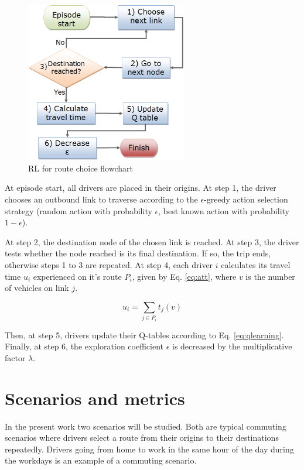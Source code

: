 \documentclass{RITA}
\newcommand{\route}[1]{\ensuremath{P_#1}}	%
\newcommand{\travTime}{\ensuremath{t_j}} 	%
\newcommand{\veh}{\ensuremath{v}}		%
\newcommand{\att}[1]{\ensuremath{u_#1}}		%
\begin{document}
\begin{figure}[ht]
    \centerline{\includegraphics[width=7cm]{img/flowchart3.png}}
    \caption{RL for route choice flowchart}
    \label{fig:flowchart}
\end{figure}

At episode start, all drivers are placed in their origins. At step 1, the driver chooses an outbound link to traverse according to the $\epsilon$-greedy action selection strategy (random action with probability $\epsilon$, best known action with probability $1 - \epsilon$). %

At step 2, the destination node of the chosen link is reached. At step 3, the driver tests whether the node reached is its final destination. If so, the trip ends, otherwise steps 1 to 3 are repeated. At step 4, each driver $i$ calculates its travel time $\att{i}$ experienced on it's route $\route{i}$, given by Eq. \eqref{eq:att}, where $\veh$ is the number of vehicles on link $j$.

\begin{equation}
\label{eq:att}
\att{i} = \sum_{j \in \route{i}} \travTime(\veh)
\end{equation}

Then, at step 5, drivers update their Q-tables according to Eq. \eqref{eq:qlearning}. Finally, at step 6, the exploration coefficient $\epsilon$ is decreased by the multiplicative factor $\lambda$.

\section{Scenarios and metrics}
\label{sec:scenario}
In the present work two scenarios will be studied. Both are typical commuting scenarios where drivers select a route from their origins to their destinations repeatedly. Drivers going from home to work in the same hour of the day during the workdays is an example of a commuting scenario.
\end{document}
